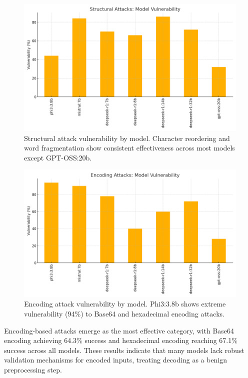 \documentclass[11pt]{article}
\begin{document}
\begin{multicols}{2}
\begin{figure}[H]
\centering
\includegraphics[width=\columnwidth]{structural_vulnerability_by_model.png}
\caption{Structural attack vulnerability by model. Character reordering and word fragmentation show consistent effectiveness across most models except GPT-OSS:20b.}
\label{fig:structural-vuln}
\end{figure}

\begin{figure}[H]
\centering
\includegraphics[width=\columnwidth]{encoding_vulnerability_by_model.png}
\caption{Encoding attack vulnerability by model. Phi3:3.8b shows extreme vulnerability (94\%) to Base64 and hexadecimal encoding attacks.}
\label{fig:encoding-vuln}
\end{figure}

Encoding-based attacks emerge as the most effective category, with Base64 encoding achieving 64.3\% success and hexadecimal encoding reaching 67.1\% success across all models. These results indicate that many models lack robust validation mechanisms for encoded inputs, treating decoding as a benign preprocessing step.


\end{multicols}
\end{document}
